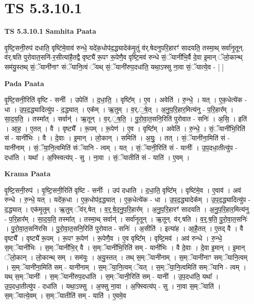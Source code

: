 \documentclass[17pt]{extarticle}
\begin{document}
\section{ TS 5.3.10.1 }

\textbf{TS 5.3.10.1 } \newline
\textbf{Samhita Paata} \newline

वृ॒ष्टि॒सनी॒रुप॑ दधाति॒ वृष्टि॑मे॒वाव॑ रुन्धे॒ यदे॑क॒धोप॑द॒द्ध्यादेक॑मृ॒तुं व॑र्.षेदनुपरि॒हारꣳ॑ सादयति॒ तस्मा॒थ् सर्वा॑नृ॒तून्. व॑र्.षति पुरोवात॒सनि॑-र॒सीत्या॑है॒तद्वै वृष्ट्यै॑ रू॒पꣳ रू॒पेणै॒व वृष्टि॒मव॑ रुन्धे सं॒ॅयानी॑भि॒र्वै दे॒वा इ॒मान् ॅलो॒कान्थ् सम॑यु॒स्तथ् सं॒ॅयानी॑नाꣳ संॅयानि॒त्वं ॅयथ् सं॒ॅयानी॑रुप॒दधा॑ति॒ यथा॒ऽफ्सु ना॒वा सं॒ॅयात्ये॒व - [  ] \newline

\textbf{Pada Paata} \newline

वृ॒ष्टि॒सनी॒रिति॑ वृष्टि - सनीः᳚ । उपेति॑ । द॒धा॒ति॒ । वृष्टि᳚म् । ए॒व । अवेति॑ । रु॒न्धे॒ । यत् । ए॒क॒धेत्ये॑क - धा । उ॒प॒द॒द्ध्यादित्यु॑प - द॒द्ध्यात् । एक᳚म् । ऋ॒तुम् । व॒र्.॒षे॒त् । अ॒नु॒प॒रि॒हार॒मित्य॑नु - प॒रि॒हार᳚म् । सा॒द॒य॒ति॒ । तस्मा᳚त् । सर्वान्॑ । ऋ॒तून् । व॒र्.॒ष॒ति॒ । पु॒रो॒वा॒त॒सनि॒रिति॑ पुरोवात - सनिः॑ । अ॒सि॒ । इति॑ । आ॒ह॒ । ए॒तत् । वै । वृष्ट्यै᳚ । रू॒पम् । रू॒पेण॑ । ए॒व । वृष्टि᳚म् । अवेति॑ । रु॒न्धे॒ । सं॒ॅयानी॑भि॒रिति॑ सं - यानी॑भिः । वै । दे॒वाः । इ॒मान् । लो॒कान् । समिति॑ । अ॒युः॒ । तत् । सं॒ॅयानी॑ना॒मिति॑ सं - यानी॑नाम् । सं॒ॅया॒नि॒त्वमिति॑ संॅयानि - त्वम् । यत् । सं॒ॅयानी॒रिति॑ सं - यानीः᳚ । उ॒प॒दधा॒तीत्यु॑प - दधा॑ति । यथा᳚ । अ॒फ्स्वित्य॑प् - सु । ना॒वा । सं॒ॅयातीति॑ सं - याति॑ । ए॒वम् ।  \newline


\textbf{Krama Paata} \newline

वृ॒ष्टि॒सनी॒रुप॑ । वृ॒ष्टि॒सनी॒रिति॑ वृष्टि - सनीः᳚ । उप॑ दधाति । द॒धा॒ति॒ वृष्टि᳚म् । वृष्टि॑मे॒व । ए॒वाव॑ । अव॑ रुन्धे । रु॒न्धे॒ यत् । यदे॑क॒धा । ए॒क॒धोप॑द॒द्ध्यात् । ए॒क॒धेत्ये॑क - धा । उ॒प॒द॒द्ध्यादेक᳚म् । उ॒प॒द॒द्ध्यादित्यु॑प - द॒द्ध्यात् । एक॑मृ॒तुम् । ऋ॒तुम् ॅव॑र्.षेत् । व॒र्॒.षे॒द॒नु॒प॒रि॒हार᳚म् । अ॒नु॒प॒रि॒हारꣳ॑ सादयति । अ॒नु॒प॒रि॒हार॒मित्य॑नु - प॒रि॒हार᳚म् । सा॒द॒य॒ति॒ तस्मा᳚त् । तस्मा॒थ् सर्वान्॑ । सर्वा॑नृ॒तून् । ऋ॒तून्. व॑र्.षति । व॒र्॒.ष॒ति॒ पु॒रो॒वा॒त॒सनिः॑ । पु॒रो॒वा॒त॒सनि॑रसि । पु॒रो॒वा॒त॒सनि॒रिति॑ पुरोवात - सनिः॑ । अ॒सीति॑ । इत्या॑ह । आ॒है॒तत् । ए॒तद् वै । वै वृष्ट्यै᳚ । वृष्ट्यै॑ रू॒पम् । रू॒पꣳ रू॒पेण॑ । रू॒पेणै॒व । ए॒व वृष्टि᳚म् । वृष्टि॒मव॑ । अव॑ रुन्धे । रु॒न्धे॒ स॒म्ॅयानी॑भिः । स॒म्ॅयानी॑भि॒र् वै । स॒म्ॅयानी॑भि॒रिति॑ सम् - यानी॑भिः । वै दे॒वाः । दे॒वा इ॒मान् । इ॒मान् ॅलो॒कान् । लो॒कान्थ् सम् । सम॑युः । अ॒यु॒स्तत् । तथ् स॒म्ॅयानी॑नाम् । स॒म्ॅयानी॑नाꣳ सम्ॅयानि॒त्वम् । स॒म्ॅयानी॑ना॒मिति॑ सम् - यानी॑नाम् । स॒म्ॅया॒नि॒त्वम् ॅयत् । स॒म्ॅया॒नि॒त्वमिति॑ सम्ॅयानि - त्वम् । यथ् स॒म्ॅयानीः᳚ । स॒म्ॅयानी॑रुप॒दधा॑ति । स॒म्ॅयानी॒रिति॑ सम् - यानीः᳚ । उ॒प॒दधा॑ति॒ यथा᳚ । उ॒प॒दधा॒तीत्यु॑प - दधा॑ति । यथा॒ऽफ्सु । अ॒फ्सु ना॒वा । अ॒फ्स्वित्य॑प् - सु । ना॒वा स॒म्ॅयाति॑ । स॒म्ॅयात्ये॒वम् । स॒म्ॅयातीति॑ सम् - याति॑ । ए॒वमे॒व \newline
\end{document}
